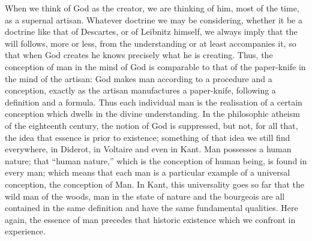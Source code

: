 \documentclass[12pt]{article}
\begin{document}
When we think of God as the creator, we are thinking of him, most of the time, as a supernal artisan. Whatever doctrine we may be considering, whether it be a doctrine like that of Descartes, or of Leibnitz himself, we always imply that the will follows, more or less, from the understanding or at least accompanies it, so that when God creates he knows precisely what he is creating. Thus, the conception of man in the mind of God is comparable to that of the paper-knife in the mind of the artisan: God makes man according to a procedure and a conception, exactly as the artisan manufactures a paper-knife, following a definition and a formula. Thus each individual man is the realisation of a certain conception which dwells in the divine understanding. In the philosophic atheism of the eighteenth century, the notion of God is suppressed, but not, for all that, the idea that essence is prior to existence; something of that idea we still find everywhere, in Diderot, in Voltaire and even in Kant. Man possesses a human nature; that “human nature,” which is the conception of human being, is found in every man; which means that each man is a particular example of a universal conception, the conception of Man. In Kant, this universality goes so far that the wild man of the woods, man in the state of nature and the bourgeois are all contained in the same definition and have the same fundamental qualities. Here again, the essence of man precedes that historic existence which we confront in experience.
\end{document}
